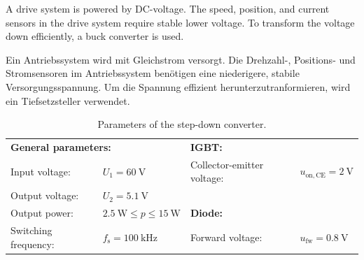 


A drive system is powered by DC-voltage.
The speed, position, and current sensors in the drive system require stable lower voltage.
To transform the voltage down efficiently, a buck converter is used.

\begin{germanblock}
    Ein Antriebssystem wird mit Gleichstrom versorgt.
    Die Drehzahl-, Positions- und Stromsensoren im Antriebssystem benötigen eine niederigere, stabile Versorgungsspannung.
    Um die Spannung effizient herunterzutranformieren, wird ein Tiefsetzsteller verwendet.
\end{germanblock}



\begin{table}[ht]
    \centering  %
    \begin{tabular}{llll}
        \toprule
        \multicolumn{2}{l}{\textbf{General parameters:}} & \multicolumn{2}{l}{\textbf{IGBT:}}                                                                                               \\
        Input voltage:                                   & $U_{\mathrm{1}} = \SI{60}{\volt}$          & Collector-emitter voltage:          & $u_{\mathrm{on},\mathrm{CE}} = \SI{2}{\volt}$ \\
        Output voltage:                                  & $U_2 = \SI{5.1}{\volt}$                    &                                     &                                               \\
        Output power:                                    & $\SI{2.5}{\watt} \le p \le \SI{15}{\watt}$ & \multicolumn{2}{l}{\textbf{Diode:}}                                                 \\
        Switching frequency:                             & $f_\mathrm{s} = \SI{100}{\kilo\hertz}$     & Forward voltage:                    & $u_\mathrm{fw} = \SI{0.8}{\volt}$             \\
        \bottomrule
    \end{tabular}
    \caption{Parameters of the step-down converter.}  %
    \label{table:ex01_Parameters of the circuit}
\end{table}

